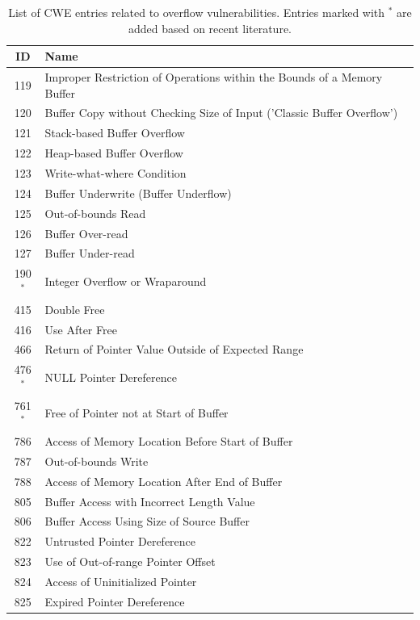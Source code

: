 \begin{table}[H]
\centering
\begin{tabular}{c|p{7.6cm}}
\hline
\textbf{ID} & \textbf{Name} \\
\hline
119 & Improper Restriction of Operations within the Bounds of a Memory Buffer \\
120 & Buffer Copy without Checking Size of Input ('Classic Buffer Overflow') \\
121 & Stack-based Buffer Overflow \\
122 & Heap-based Buffer Overflow \\
123 & Write-what-where Condition \\
124 & Buffer Underwrite (Buffer Underflow) \\
125 & Out-of-bounds Read \\
126 & Buffer Over-read \\
127 & Buffer Under-read \\
190$^\ast$ & Integer Overflow or Wraparound \\
415 & Double Free \\
416 & Use After Free \\
466 & Return of Pointer Value Outside of Expected Range \\
476$^\ast$ & NULL Pointer Dereference \\
761$^\ast$ & Free of Pointer not at Start of Buffer \\
786 & Access of Memory Location Before Start of Buffer \\
787 & Out-of-bounds Write \\
788 & Access of Memory Location After End of Buffer \\
805 & Buffer Access with Incorrect Length Value \\
806 & Buffer Access Using Size of Source Buffer \\
822 & Untrusted Pointer Dereference \\
823 & Use of Out-of-range Pointer Offset \\
824 & Access of Uninitialized Pointer \\
825 & Expired Pointer Dereference \\
\hline
\end{tabular}
\caption{List of CWE entries related to overflow vulnerabilities. Entries marked with $^\ast$ are added based on recent literature.}
\label{tab:cwe-list}
\end{table}

